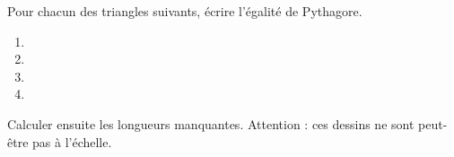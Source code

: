 
\begin{exercice}\label{exosmath-0842}

    Pour chacun des triangles suivants, écrire l'égalité de Pythagore.
    \begin{multicols}{2}
        \begin{enumerate}
            \item
   
   \item
   
   \item
   
   \item
   
        \end{enumerate}
    \end{multicols}
    Calculer ensuite les longueurs manquantes. Attention : ces dessins ne sont peut-être pas à l'échelle.

\end{exercice}
